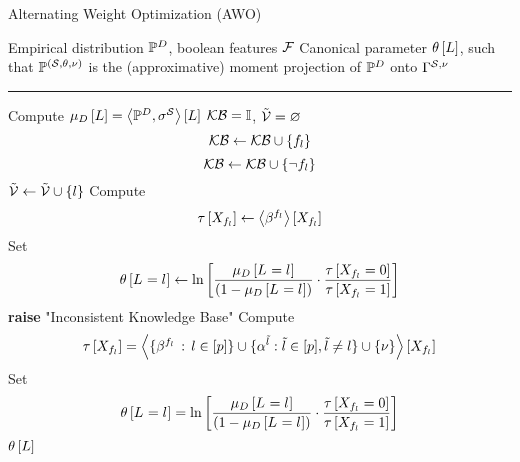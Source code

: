\begin{algorithm}[hbt!]
\caption{Alternating Weight Optimization (AWO)}\label{alg:AWO}
\begin{algorithmic}
	\Require Empirical distribution $\mathbb{P}^{D}$, boolean features $\mathcal{F}$ %
	\Ensure Canonical parameter $\theta\left[L\right]$, such that $\mathbb{P}^{(\mathcal{S},\theta,\nu)}$ is the (approximative) moment projection of $\mathbb{P}^{D}$ onto $\Gamma^{\mathcal{S},\nu}$
	\hrule
    \State Compute $\mu_{D}\left[L\right]= \left\langle \mathbb{P}^{D},\sigma^{\mathcal{S}}\right\rangle \left[ L \right]$
	\State $\mathcal{KB} = \mathbb{I}$, $\tilde{\mathcal{V}}=\varnothing$
\For{$\selindexin$}
		\[ \mathcal{KB} \leftarrow \mathcal{KB} \cup \{f_{l}\}\]
		\[ \mathcal{KB} \leftarrow \mathcal{KB} \cup \{\lnot f_{l}\}\]
	\Else
		\State $\tilde{\mathcal{V}}\leftarrow \tilde{\mathcal{V}} \cup \{l\}$
	\EndIf
\EndFor
\For{$\selindex\in\secnodes$}
		\State Compute
		\[ \tau\left[X_{f_{l}}\right]
		\leftarrow \left\langle \beta^{f_{l}}\right\rangle \left[ X_{f_{l}} \right] \]
		\State Set
		\begin{align*}
	 		\theta\left[L_{}=l_{}\right]
			\leftarrow \ln \left[ 
			\frac{\mu_{D}\left[L_{}=l_{}\right]}{(1-\mu_{D}\left[L_{}=l_{}\right])}
			\cdot \frac{\tau\left[X_{f_{l}}=0\right]}{\tau\left[X_{f_{l}}=1\right]}
			 \right]
		\end{align*}
\EndFor
{}
	 \State \textbf{raise} "Inconsistent Knowledge Base"
\EndIf
{}
\For{$\selindex\in\secnodes$}
	\State Compute
	\begin{align*}
	 	\tau\left[X_{f_{l}}\right]
		= \left\langle \{\beta^{f_{l}} \, : \, l\in[p]\}
		\cup\{\alpha^{\tilde{l}} : \tilde{l} \in [p], \tilde{l}\neq l\}
		\cup\{\nu\}\right\rangle \left[ X_{f_{l}} \right]
	\end{align*}
	\State Set
	\begin{align*}
	 	\theta\left[L_{}=l_{}\right] = \ln \left[ 
		\frac{\mu_{D}\left[L_{}=l_{}\right]}{(1-\mu_{D}\left[L_{}=l_{}\right])}
		\cdot \frac{\tau\left[X_{f_{l}}=0\right]}{\tau\left[X_{f_{l}}=1\right]}
		 \right]
	\end{align*}
\EndFor
\EndWhile
	\State \Return $\theta\left[L\right]$
\end{algorithmic}
\end{algorithm}


